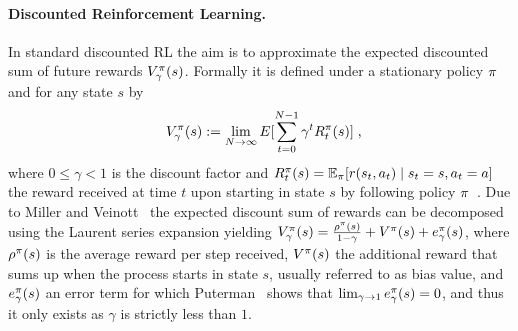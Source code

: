 \documentclass[envcountsame]{llncs}
\begin{document}
\paragraph{Discounted Reinforcement Learning.}
In standard discounted RL the aim is to approximate the expected discounted sum of future rewards
\(V_{\gamma}^{\pi}(s)\). Formally it is defined under a stationary policy \(\pi\) and for any
state \(s\) by
\begin{align*}
  V_{\gamma}^{\pol}(s) \defsym \lim_{N \to \infty} E[\sum_{t=0}^{N-1} \gamma^{t} R_{t}^{\pol}(s)]\tcom
\end{align*}
where \(0 \leqslant \gamma < 1\) is the discount factor and
\(R_{t}^{\pi}(s) = \operatorname*{\mathbb{E}}_{\pi}[ r(s_{t},a_{t}) \mid s_{t} = s, a_{t} = a]\) the reward received at
time \(t\) upon starting in state \(s\) by following policy
\(\pi\)~\cite[e.g.]{Mahadevan96_AverageRewardReinforcementLearningFoundationsAlgorithmsAndEmpiricalResults}.
%
Due to Miller and Veinott~\cite{MillerVeinott1969} the expected discount sum of rewards can be
decomposed using the Laurent series expansion yielding
%
  \(V_{\gamma}^{\pi}(s) = \frac{\rho^{\pi}(s)}{1-\gamma} + V^{\pi}(s) + e_{\gamma}^{\pi}(s)\),
%
  where \(\rho^{\pi}(s)\) is the average reward per step received, \(V^{\pi}(s)\) the
  additional reward that sums up when the process starts in state \(s\), usually referred to as bias
  value, and \(e_{\gamma}^{\pi}(s)\) an error term for which Puterman~\cite[p.341]{Puterman94}
  shows that \(\lim_{\gamma \to 1} e_{\gamma}^{\pi}(s) = 0\), and thus it only exists as \(\gamma\)
  is strictly less than \(1\).
\end{document}
